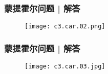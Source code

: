 \begin{frame}
  \frametitle{蒙提霍尔问题 | 解答}
  \begin{figure}
    \centering
    \texttt{[image: c3.car.02.png]}
  \end{figure}
\end{frame}
\begin{frame}
  \frametitle{蒙提霍尔问题 | 解答}
  \begin{figure}
    \centering
    \texttt{[image: c3.car.03.jpg]}
  \end{figure}
\end{frame}


